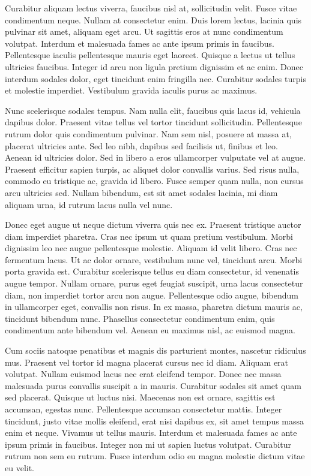 Curabitur aliquam lectus viverra, faucibus nisl at, sollicitudin velit. Fusce vitae condimentum neque. Nullam at consectetur enim. Duis lorem lectus, lacinia quis pulvinar sit amet, aliquam eget arcu. Ut sagittis eros at nunc condimentum volutpat. Interdum et malesuada fames ac ante ipsum primis in faucibus. Pellentesque iaculis pellentesque mauris eget laoreet. Quisque a lectus ut tellus ultricies faucibus. Integer id arcu non ligula pretium dignissim et ac enim. Donec interdum sodales dolor, eget tincidunt enim fringilla nec. Curabitur sodales turpis et molestie imperdiet. Vestibulum gravida iaculis purus ac maximus.

Nunc scelerisque sodales tempus. Nam nulla elit, faucibus quis lacus id, vehicula dapibus dolor. Praesent vitae tellus vel tortor tincidunt sollicitudin. Pellentesque rutrum dolor quis condimentum pulvinar. Nam sem nisl, posuere at massa at, placerat ultricies ante. Sed leo nibh, dapibus sed facilisis ut, finibus et leo. Aenean id ultricies dolor. Sed in libero a eros ullamcorper vulputate vel at augue. Praesent efficitur sapien turpis, ac aliquet dolor convallis varius. Sed risus nulla, commodo eu tristique ac, gravida id libero. Fusce semper quam nulla, non cursus arcu ultricies sed. Nullam bibendum, est sit amet sodales lacinia, mi diam aliquam urna, id rutrum lacus nulla vel nunc.

Donec eget augue ut neque dictum viverra quis nec ex. Praesent tristique auctor diam imperdiet pharetra. Cras nec ipsum ut quam pretium vestibulum. Morbi dignissim leo nec augue pellentesque molestie. Aliquam id velit libero. Cras nec fermentum lacus. Ut ac dolor ornare, vestibulum nunc vel, tincidunt arcu. Morbi porta gravida est. Curabitur scelerisque tellus eu diam consectetur, id venenatis augue tempor. Nullam ornare, purus eget feugiat suscipit, urna lacus consectetur diam, non imperdiet tortor arcu non augue. Pellentesque odio augue, bibendum in ullamcorper eget, convallis non risus. In ex massa, pharetra dictum mauris ac, tincidunt bibendum nunc. Phasellus consectetur condimentum enim, quis condimentum ante bibendum vel. Aenean eu maximus nisl, ac euismod magna.

Cum sociis natoque penatibus et magnis dis parturient montes, nascetur ridiculus mus. Praesent vel tortor id magna placerat cursus nec id diam. Aliquam erat volutpat. Nullam euismod lacus nec erat eleifend tempor. Donec nec massa malesuada purus convallis suscipit a in mauris. Curabitur sodales sit amet quam sed placerat. Quisque ut luctus nisi. Maecenas non est ornare, sagittis est accumsan, egestas nunc. Pellentesque accumsan consectetur mattis. Integer tincidunt, justo vitae mollis eleifend, erat nisi dapibus ex, sit amet tempus massa enim et neque. Vivamus ut tellus mauris. Interdum et malesuada fames ac ante ipsum primis in faucibus. Integer non mi ut sapien luctus volutpat. Curabitur rutrum non sem eu rutrum. Fusce interdum odio eu magna molestie dictum vitae eu velit.

